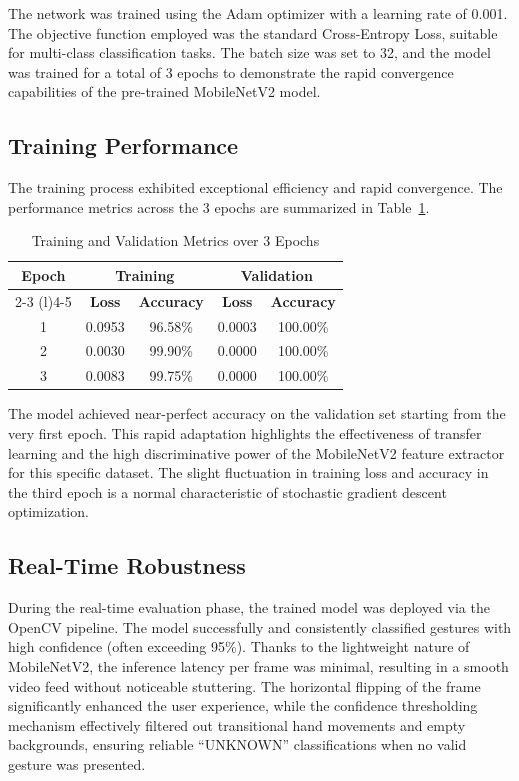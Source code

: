 \documentclass[conference]{IEEEtran}
\begin{document}
The network was trained using the Adam optimizer with a learning rate of 0.001. The objective function employed was the standard Cross-Entropy Loss, suitable for multi-class classification tasks. The batch size was set to 32, and the model was trained for a total of 3 epochs to demonstrate the rapid convergence capabilities of the pre-trained MobileNetV2 model.

\subsection{Training Performance}
The training process exhibited exceptional efficiency and rapid convergence. The performance metrics across the 3 epochs are summarized in Table~\ref{tab:training_metrics}.

\begin{table}[htbp]
\centering
\caption{Training and Validation Metrics over 3 Epochs}
\label{tab:training_metrics}
\begin{tabular}{@{}ccccc@{}}
\toprule
\multirow{2}{*}{\textbf{Epoch}} & \multicolumn{2}{c}{\textbf{Training}} & \multicolumn{2}{c}{\textbf{Validation}} \\ \cmidrule(lr){2-3} \cmidrule(l){4-5} 
                                & \textbf{Loss}    & \textbf{Accuracy}  & \textbf{Loss}     & \textbf{Accuracy}   \\ \midrule
1                               & 0.0953           & 96.58\%            & 0.0003            & 100.00\%            \\
2                               & 0.0030           & 99.90\%            & 0.0000            & 100.00\%            \\
3                               & 0.0083           & 99.75\%            & 0.0000            & 100.00\%            \\ \bottomrule
\end{tabular}
\end{table}

The model achieved near-perfect accuracy on the validation set starting from the very first epoch. This rapid adaptation highlights the effectiveness of transfer learning and the high discriminative power of the MobileNetV2 feature extractor for this specific dataset. The slight fluctuation in training loss and accuracy in the third epoch is a normal characteristic of stochastic gradient descent optimization.

\subsection{Real-Time Robustness}
During the real-time evaluation phase, the trained model was deployed via the OpenCV pipeline. The model successfully and consistently classified gestures with high confidence (often exceeding 95\%). Thanks to the lightweight nature of MobileNetV2, the inference latency per frame was minimal, resulting in a smooth video feed without noticeable stuttering. The horizontal flipping of the frame significantly enhanced the user experience, while the confidence thresholding mechanism effectively filtered out transitional hand movements and empty backgrounds, ensuring reliable ``UNKNOWN'' classifications when no valid gesture was presented.
\end{document}
